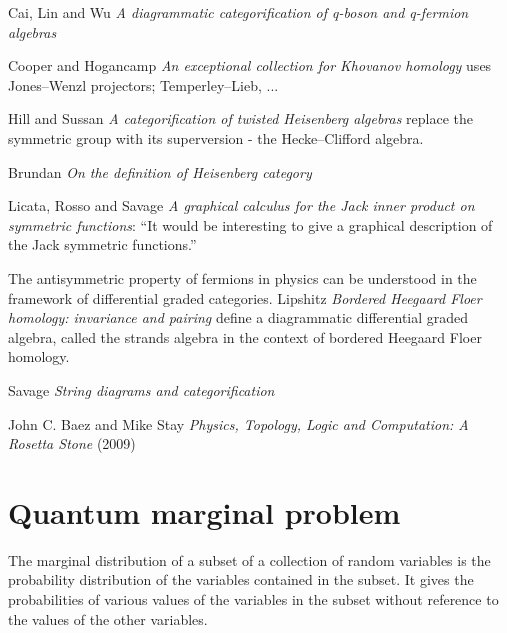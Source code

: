 \begin{description}
Cai, Lin and Wu
{\em A diagrammatic categorification of q-boson and q-fermion algebras}

Cooper and Hogancamp
{\em An exceptional collection for {Khovanov} homology} uses
Jones–Wenzl projectors; Temperley–Lieb, ...

Hill and Sussan {\em A categorification of twisted
{Heisenberg} algebras}
replace the symmetric group with its superversion - the Hecke–Clifford
algebra.


Brundan {\em On the definition of {Heisenberg} category}

Licata, Rosso and Savage {\em A graphical calculus for the
{Jack} inner product on symmetric functions}: ``It would be interesting to
give a graphical description of the Jack symmetric functions.''

The antisymmetric property of fermions in physics can be understood in
the framework of differential graded categories.
Lipshitz \etal{} {\em Bordered Heegaard Floer homology:
invariance and pairing} define a diagrammatic differential graded
algebra, called the strands algebra in the context of bordered Heegaard
Floer homology.

Savage {\em String diagrams and categorification}

John C. Baez and Mike Stay
{\em Physics, Topology, Logic and Computation:
 {A Rosetta Stone}} (2009)


\end{description}

\newpage
\section{Quantum marginal problem}
\label{s-QMP}

The
 {marginal
distribution} of a subset of a collection of random variables is the
probability distribution of the variables contained in the subset. It gives
the probabilities of various values of the variables in the subset without
reference to the values of the other variables.

